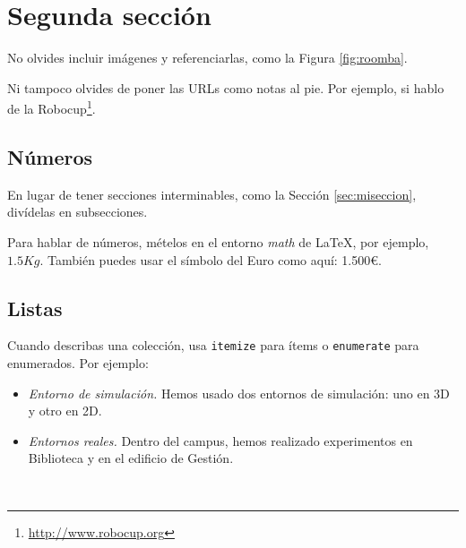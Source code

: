 

\section{Segunda sección}
\label{sec:segundaseccion}

No olvides incluir imágenes y referenciarlas, como la Figura \ref{fig:roomba}.


Ni tampoco olvides de poner las URLs como notas al pie. Por ejemplo, si hablo de la Robocup\footnote{\url{http://www.robocup.org}}.

\subsection{Números}
\label{sec:subseccion}

En lugar de tener secciones interminables, como la Sección \ref{sec:miseccion}, divídelas en subsecciones.

Para hablar de números, mételos en el entorno \textit{math} de \LaTeX, por ejemplo, $1.5Kg$. También puedes usar el símbolo del Euro como aquí: 1.500\euro.

\subsection{Listas}

Cuando describas una colección, usa \texttt{itemize} para ítems o \texttt{enumerate} para enumerados. Por ejemplo:

\begin{itemize}
 \item \textit{Entorno de simulación.} Hemos usado dos entornos de simulación: uno en 3D y otro en 2D.
 \item \textit{Entornos reales.} Dentro del campus, hemos realizado experimentos en Biblioteca y en el edificio de Gestión.
\end{itemize}\

